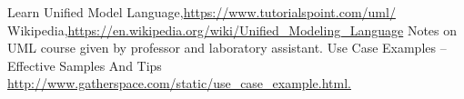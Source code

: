 \begin{thebibliography}{99999}
\singlespace\normalsize

 Learn Unified Model Language,\url{https://www.tutorialspoint.com/uml/}
 Wikipedia,\url{https://en.wikipedia.org/wiki/Unified_Modeling_Language}
 Notes on UML course given by professor and laboratory assistant.
 Use Case Examples -- Effective Samples And Tips \url{http://www.gatherspace.com/static/use_case_example.html.}




\end{thebibliography}
